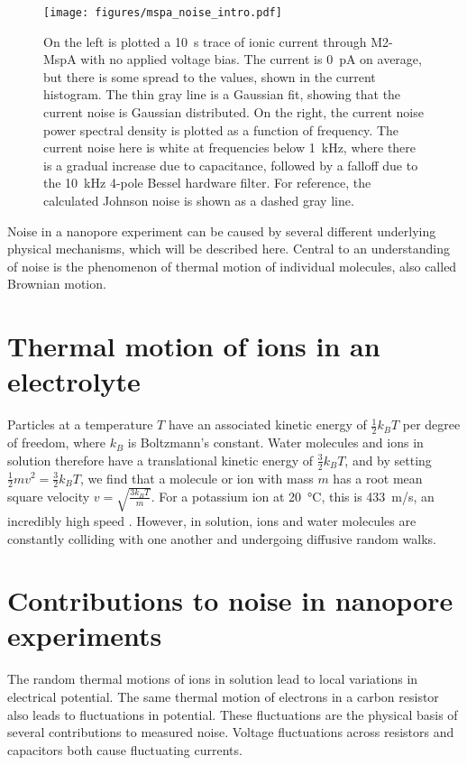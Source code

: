 \begin{figure}[h]
\begin{centering}
\texttt{[image: figures/mspa\_noise\_intro.pdf]}
\caption[Current noise in the MspA nanopore]{On the left is plotted a \SI{10}{\s} trace of ionic current through M2-MspA with no applied voltage bias.  The current is \SI{0}{\pA} on average, but there is some spread to the values, shown in the current histogram.  The thin gray line is a Gaussian fit, showing that the current noise is Gaussian distributed.  On the right, the current noise power spectral density is plotted as a function of frequency.  The current noise here is white at frequencies below \SI{1}{\kHz}, where there is a gradual increase due to capacitance, followed by a falloff due to the \SI{10}{\kHz} 4-pole Bessel hardware filter.  For reference, the calculated Johnson noise is shown as a dashed gray line.}
\label{fig:mspa_noise_intro}
\end{centering}
\end{figure}

Noise in a nanopore experiment can be caused by several different underlying physical mechanisms, which will be described here.  Central to an understanding of noise is the phenomenon of thermal motion of individual molecules, also called Brownian motion.

\section{Thermal motion of ions in an electrolyte}

Particles at a temperature $T$ have an associated kinetic energy of $\frac{1}{2} k_B T$ per degree of freedom, where $k_B$ is Boltzmann's constant.  Water molecules and ions in solution therefore have a translational kinetic energy of $\frac{3}{2} k_B T$, and by setting $\frac{1}{2} mv^2 = \frac{3}{2} k_B T$, we find that a molecule or ion with mass $m$ has a root mean square velocity $v=\sqrt{\frac{3 k_B T}{m}}$.  For a potassium ion at \SI{20}{\celsius}, this is \SI{433}{\m/\s}, an incredibly high speed \citep{Hille2001}.  However, in solution, ions and water molecules are constantly colliding with one another and undergoing diffusive random walks.

\section{Contributions to noise in nanopore experiments}

The random thermal motions of ions in solution lead to local variations in electrical potential.  The same thermal motion of electrons in a carbon resistor also leads to fluctuations in potential.  These fluctuations are the physical basis of several contributions to measured noise.  Voltage fluctuations across resistors and capacitors both cause fluctuating currents.

